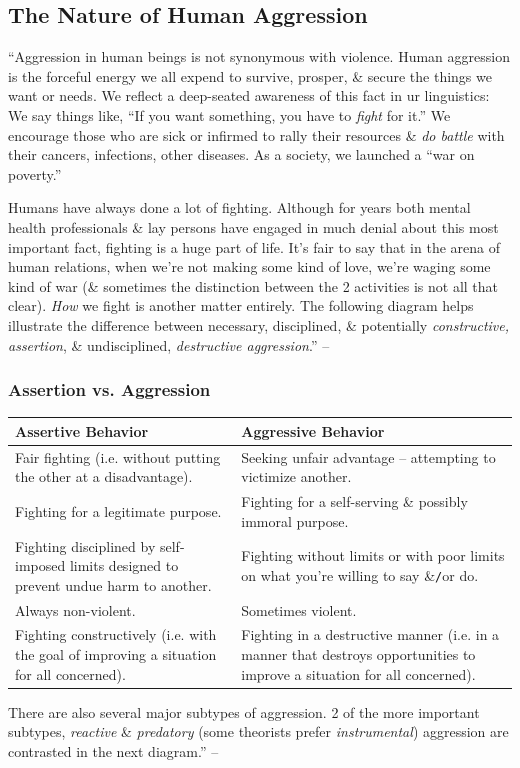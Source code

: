 \documentclass{article}
\numberwithin{equation}{section}
\begin{document}
\subsection{The Nature of Human Aggression}
``Aggression in human beings is not synonymous with violence. Human aggression is the forceful energy we all expend to survive, prosper, \& secure the things we want or needs. We reflect a deep-seated awareness of this fact in ur linguistics: We say things like, ``If you want something, you have to \textit{fight} for it.'' We encourage those who are sick or infirmed to rally their resources \& \textit{do battle} with their cancers, infections, other diseases. As a society, we launched a ``war on poverty.''

Humans have always done a lot of fighting. Although for years both mental health professionals \& lay persons have engaged in much denial about this most important fact, fighting is a huge part of life. It's fair to say that in the arena of human relations, when we're not making some kind of love, we're waging some kind of war (\& sometimes the distinction between the 2 activities is not all that clear). \textit{How} we fight is another matter entirely. The following diagram helps illustrate the difference between necessary, disciplined, \& potentially \textit{constructive, assertion}, \& undisciplined, \textit{destructive aggression}.'' -- \cite[pp. 87--88]{Simon2011}

\subsubsection{Assertion vs. Aggression}

\begin{table}[H]
	\centering
	\begin{tabular}{|p{}|p{}|}
		\hline
		\textbf{Assertive Behavior} & \textbf{Aggressive Behavior} \\
		\hline
		Fair fighting (i.e. without putting the other at a disadvantage). & Seeking unfair advantage -- attempting to victimize another. \\
		\hline
		Fighting for a legitimate purpose. & Fighting for a self-serving \& possibly immoral purpose. \\
		\hline
		Fighting disciplined by self-imposed limits designed to prevent undue harm to another. & Fighting without limits or with poor limits on what you're willing to say \&\texttt{/}or do. \\
		\hline
		Always non-violent. & Sometimes violent. \\
		\hline
		Fighting constructively (i.e. with the goal of improving a situation for all concerned). & Fighting in a destructive manner (i.e. in a manner that destroys opportunities to improve a situation for all concerned). \\
		\hline
	\end{tabular}
\end{table}
There are also several major subtypes of aggression. 2 of the more important subtypes, \textit{reactive} \& \textit{predatory} (some theorists prefer \textit{instrumental}) aggression are contrasted in the next diagram.'' -- \cite[p. 88]{Simon2011}
\end{document}
